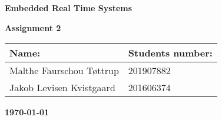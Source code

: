 \thispagestyle{empty}
\centerline{\fontsize{60}{70}\selectfont\textbf{Embedded Real Time Systems}}
\vspace{10mm}
\vspace{40mm}
\centerline{\Huge\textbf{Assignment 2}}
\vspace{40mm}

\begin{table}[htb]
\fontsize{16}{30}\selectfont
\centering
\begin{tabular}{| p{85mm} | p{60 mm} |}
\hline
\textbf{Name:}                      &  \textbf{Students number:}     \\ \hline
Malthe Faurschou Tøttrup            &  201907882                     \\ \hline
Jakob Levisen Kvistgaard            &  201606374                     \\ \hline
\end{tabular}
\end{table}

\vspace{10mm}
\vspace{20mm}

\centerline{\large\textbf{\today}}
\centerline{\large\textbf{ }}

